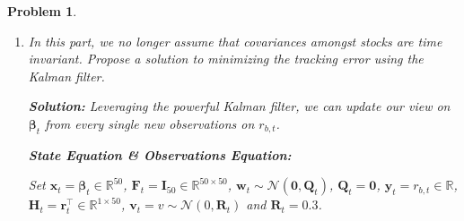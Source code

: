 \documentclass[11pt]{article}
\theoremstyle{plain} %
\newtheorem{problem}[theorem]{Problem}
\newenvironment{solution}
{\color{C2}\normalfont\begin{framed}\begingroup\textbf{Solution:} }
  {\endgroup\end{framed}}
\theoremstyle{remark}
\begin{document}
\begin{problem}
\begin{enumerate}[label=(\alph*)]
\begin{solution}
          Since minimizing the given loss function amounts to minimizing the
          MSE which falls under the context of linear regression, we can
          view this index tracking problem as a regression problem. Since
          the covaraince matrix is assumed to be constant over time, we can
          specify a rolling window, say $30$ days, and treat pairs $\{(r_{b,
                t - i}, \mathbf{r}_{t - i}))\}$, $i = 0, 1, \ldots, 29$ as
          samples. Let's denote $\mathbf{y}_t = (r_{b, t}, r_{b, t - 1},
            \ldots, r_{b, t - 29}) \in \mathbb{R}^{30}$ as the regressand, and
          $\mathbf{R}_t = \begin{bmatrix}
              \mathbf{r}_{t}^\top \\
              \vdots              \\
              \mathbf{r}_{t - 29}^\top
            \end{bmatrix}$ as regressors. Then, for time $t$, we can assume
          $$
            \mathbf{y}_t = \mathbf{R}_t \boldsymbol{\beta}_t + \boldsymbol{\epsilon}_t \quad \text{ where }\quad \boldsymbol{\epsilon}_t \sim \mathcal{N}\left(\boldsymbol{0}, \mathbf{\Omega}_t\right)
          $$
          By classical linear regression, we have
          $$
            \boldsymbol{\beta}_t^{*} = \left(\mathbf{R}_t^\top \mathbf{R}_t\right)^{-1}\mathbf{R}_t^\top \mathbf{y}_t
          $$
          By the Gauss-Markov theorem, $\boldsymbol{\beta}_t^{*}$ is the best unbiased linear predictor under the assumptions of classical
          linear regression.
        \end{solution}
  \item In this part, we no longer assume that covariances amongst stocks are
        time invariant. Propose a solution to minimizing the tracking error using the
        Kalman filter.

        \begin{solution}
          Leveraging the powerful Kalman filter, we can update our view on $\boldsymbol{\beta}_t$ from every single new observations on $r_{b, t}$.

          \textbf{State Equation \& Observations Equation:}

          Set $\mathbf{x}_{t} = \boldsymbol{\beta}_t \in \mathbb{R}^{50}$, $\mathbf{F}_{t} = \mathbf{I}_{50}\in \mathbb{R}^{50 \times 50}$,
          $\mathbf{w}_{t}\sim \mathcal{N}\left(\boldsymbol{0}, \mathbf{Q}_{t}\right)$, $\mathbf{Q}_{t} = \boldsymbol{0}$,
          $\mathbf{y}_{t} = r_{b, t}\in \mathbb{R}$,
          $\mathbf{H}_{t} = \mathbf{r}_{t}^\top\in \mathbb{R}^{1\times 50}$,
          $\mathbf{v}_{t} = v \sim \mathcal{N}\left(0, \mathbf{R}_{t}\right)$ and $\mathbf{R}_{t} = 0.3$.


\end{solution}
\end{enumerate}
\end{problem}
\end{document}
